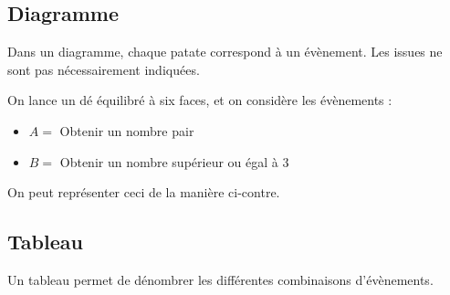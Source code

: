 \subsection{Diagramme}

\begin{desc}
  Dans un diagramme, chaque \og{}patate\fg{} correspond à un évènement. Les issues
  ne sont pas nécessairement indiquées.
\end{desc}

\begin{exemple}
  \begin{multicols}{2}
    On lance un dé équilibré à six faces, et on considère les évènements :
    \begin{itemize}
      \item $A=$ \og{}Obtenir un nombre pair\fg{}
      \item $B=$ \og{}Obtenir un nombre supérieur ou égal à 3\fg{}
    \end{itemize}

    On peut représenter ceci de la manière ci-contre.

    \begin{center}
    \end{center}
  \end{multicols}
\end{exemple}

\subsection{Tableau}

\begin{desc}
  Un tableau permet de dénombrer les différentes combinaisons d'évènements.
\end{desc}

